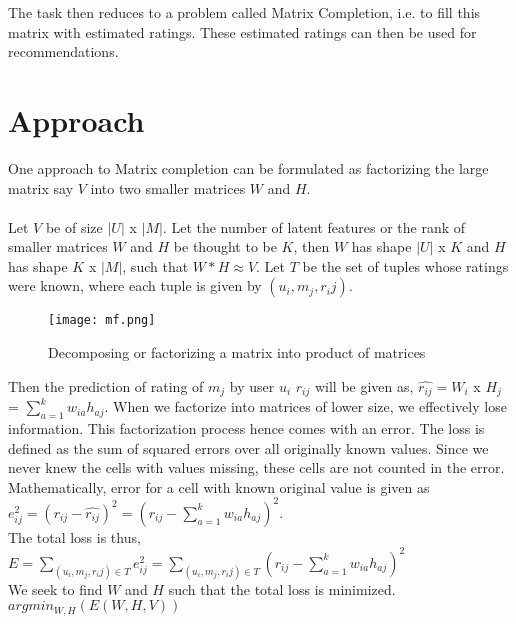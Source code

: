 \documentclass[a4paper,11pt]{article}
\begin{document}
The task then reduces to a problem called Matrix Completion, i.e. to fill this matrix with estimated ratings. These estimated ratings can then be used for recommendations.
\section{Approach}
One approach to Matrix completion can be formulated as factorizing the large matrix say $V$ into two smaller matrices $W$ and $H$. \\\\ Let $V$ be of size $|U|$ x $|M|$. Let the number of latent features or the rank of smaller matrices $W$ and $H$ be thought to be $K$, then $W$ has shape $|U|$ x $K$ and $H$ has shape $K$ x $|M|$, such that $W * H \approx V$. Let $T$ be the set of tuples whose ratings were known, where each tuple is given by $(u_i, m_j, r_ij)$. 
\begin{figure}[h]
   \centering
    \texttt{[image: mf.png]}
    \caption{Decomposing or factorizing a matrix into product of matrices}
   \label{fig:factorization}
\end{figure}

Then the prediction of rating of $m_j$ by user $u_i$ $r_{ij}$ will be given as, $ \hat{r_{ij}} = W_i$ x $H_j$ = $\sum_{a=1}^{k} w_{ia}h_{aj} $. 
When we factorize into matrices of lower size, we effectively lose information. This factorization process hence comes with an error. The loss is defined as the sum of squared errors over all originally known values. Since we never knew the cells with values missing, these cells are not counted in the error. \\
Mathematically, error for a cell with known original value is given as \\ $e_{ij}^{2} = ( r_{ij} - \hat{r_{ij}} )^2  = (r_{ij} - \sum_{a=1}^{k} w_{ia}h_{aj})^2$. \\The total loss is thus, \\$ E = \sum_{(u_i, m_j, r_ij) \in T} e_{ij}^{2} = \sum_{(u_i, m_j, r_ij) \in T} (r_{ij} - \sum_{a=1}^{k} w_{ia}h_{aj})^2 $\\
We seek to find $W$ and $H$ such that the total loss is minimized. \\
$argmin_{W,H}(E(W, H, V)) $
\end{document}
